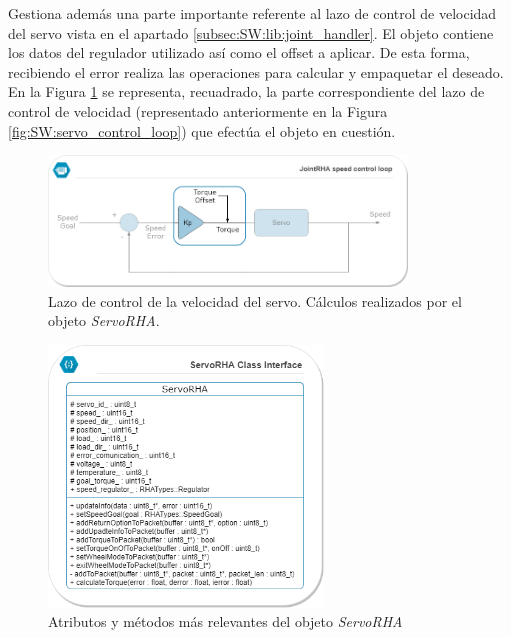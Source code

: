         Gestiona además una parte importante referente al lazo de control de velocidad del servo vista en el apartado \ref{subsec:SW:lib:joint_handler}. El objeto  contiene los datos del regulador utilizado así como el offset a aplicar. De esta forma, recibiendo el error realiza las operaciones para calcular y empaquetar el  deseado. En la Figura \ref{fig:SW:servo_control_loop_servo_part} se representa, recuadrado, la parte correspondiente del lazo de control de velocidad (representado anteriormente en la Figura \ref{fig:SW:servo_control_loop}) que efectúa el objeto en cuestión.
        \begin{figure}[H]
        \centering
        \includegraphics[width=0.85\textwidth]{figuras/SW/servo_control_loop_servo_part.png}   
        \caption{Lazo de control de la velocidad del servo. Cálculos realizados por el objeto \textit{ServoRHA}.}
        \label{fig:SW:servo_control_loop_servo_part}
        \end{figure}
        
        \begin{figure}[H]
            \centering
            \includegraphics[width=0.65\textwidth]{figuras/SW/class_diagram_SRHA.png}   
            \caption{Atributos y métodos más relevantes del objeto \textit{ServoRHA}}
            \label{fig:SW:class_diagram_SRHA}
        \end{figure}
        
